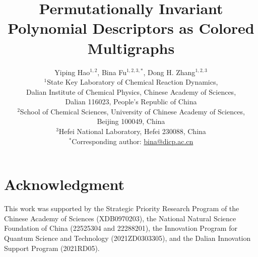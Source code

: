 \documentclass[12pt,a4paper]{article}
\title{Permutationally Invariant Polynomial Descriptors as Colored Multigraphs}
\author{
  Yiping Hao$^{1,2}$, Bina Fu$^{1,2,3,*}$, Dong H. Zhang$^{1,2,3}$\\[0.7em]
  \small $^{1}$State Key Laboratory of Chemical Reaction Dynamics,\\[-0.2em]
  \small Dalian Institute of Chemical Physics, Chinese Academy of Sciences,\\[-0.2em]
  \small Dalian 116023, People's Republic of China\\
  \small $^{2}$School of Chemical Sciences, University of Chinese Academy of Sciences,\\[-0.2em]
  \small Beijing 100049, China\\
  \small $^{3}$Hefei National Laboratory, Hefei 230088, China\\[0.4em]
  \small $^{*}$Corresponding author: \href{mailto:bina@dicp.ac.cn}{bina@dicp.ac.cn}
}
\date{}
\begin{document}
\maketitle

\begin{abstract}

\end{abstract}







\section*{Acknowledgment}
\begin{sloppypar}
This work was supported by the Strategic Priority Research Program of the Chinese Academy of Sciences (XDB0970203), the National Natural Science Foundation of China (22525304 and 22288201),  the Innovation Program for Quantum Science and Technology (2021ZD0303305), and the Dalian Innovation Support Program (2021RD05).
\end{sloppypar}



\end{document}
